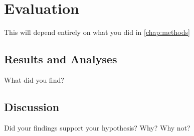 \chapter{Evaluation}
\label{chap:evaluation}

This will depend entirely on what you did in \ref{chap:methods}

\section{Results and Analyses}
What did you find?


\section{Discussion}

Did your findings support your hypothesis?
Why? Why not?

